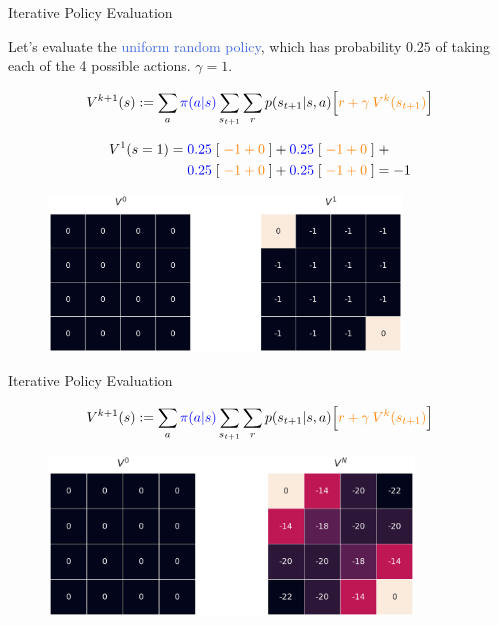 \documentclass{beamer}
\begin{document}
\begin{frame}{Iterative Policy Evaluation}


\begin{footnotesize}
Let's evaluate the \textcolor{RoyalBlue}{uniform random policy}, which has probability $0.25$ of taking each of the 4 possible actions.  $\gamma = 1$.

\begin{align*}
    V^{k+1}(s) := \sum_a \textcolor{blue}{\pi(a|s)} \sum_{s_{t+1}} \sum_r p(s_{t+1}|s,a)\Big[\textcolor{orange}{r+\gamma\:V^k(s_{t+1})}\Big]
\end{align*}

\begin{align*}
    V^1(s = 1) = \; &\textcolor{blue}{0.25} \; [\;\textcolor{orange}{-1 + 0}\; ] + \textcolor{blue}{0.25} \; [\;\textcolor{orange}{-1+0}\; ]\; + \\
    &\textcolor{blue}{0.25} \; [\;\textcolor{orange}{-1+0}\; ] + \textcolor{blue}{0.25} \; [\;\textcolor{orange}{-1+0}\; ] = -1
\end{align*}


\end{footnotesize}

\begin{figure}[t]
\includegraphics[width=9.4cm]{./images/step0.png}
\centering
\end{figure}

\end{frame}



\begin{frame}{Iterative Policy Evaluation}

\begin{small}
\begin{align*}
    V^{k+1}(s) := \sum_a \textcolor{blue}{\pi(a|s)} \sum_{s_{t+1}} \sum_r p(s_{t+1}|s,a)\Big[\textcolor{orange}{r+\gamma\:V^k(s_{t+1})}\Big]
\end{align*}

\end{small}
\begin{figure}[t]
\includegraphics[width=9.7cm]{./images/stepn.png}
\centering
\end{figure}

\end{frame}
\end{document}
